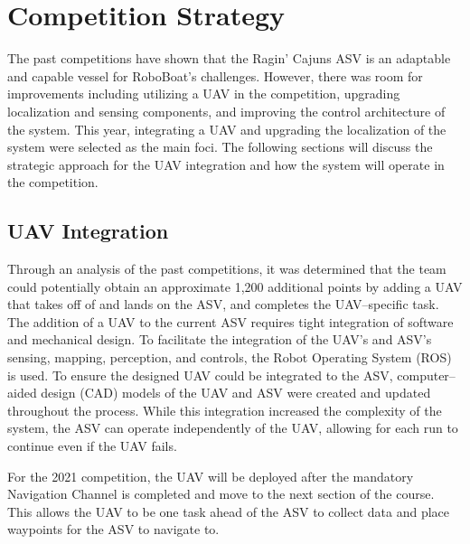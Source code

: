 \documentclass[letterpaper, 12 pt, conference]{ieeeconf}
\begin{document}
\pagestyle{fancyplain} 
\section{Competition Strategy}
% 
The past competitions have shown that the Ragin' Cajuns ASV is an adaptable and capable vessel for RoboBoat's challenges. However, there was room for improvements including utilizing a UAV in the competition, upgrading localization and sensing components, and improving the control architecture of the system. This year, integrating a UAV and upgrading the localization of the system were selected as the main foci. The following sections will discuss the strategic approach for the UAV integration and how the system will operate in the competition.
% 
\subsection{UAV Integration} 
Through an analysis of the past competitions, it was determined that the team could potentially obtain an approximate 1,200 additional points by adding a UAV that takes off of and lands on the ASV, and completes the UAV--specific task. The addition of a UAV to the current ASV requires tight integration of software and mechanical design. To facilitate the integration of the UAV's and ASV's sensing, mapping, perception, and controls, the Robot Operating System (ROS) is used. To ensure the designed UAV could be integrated to the ASV, computer--aided design (CAD) models of the UAV and ASV were created and updated throughout the process. While this integration increased the complexity of the system, the ASV can operate independently of the UAV, allowing for each run to continue even if the UAV fails. 

For the 2021 competition, the UAV will be deployed after the mandatory Navigation Channel is completed and move to the next section of the course. This allows the UAV to be one task ahead of the ASV to collect data and place waypoints for the ASV to navigate to. 
% 
\end{document}
